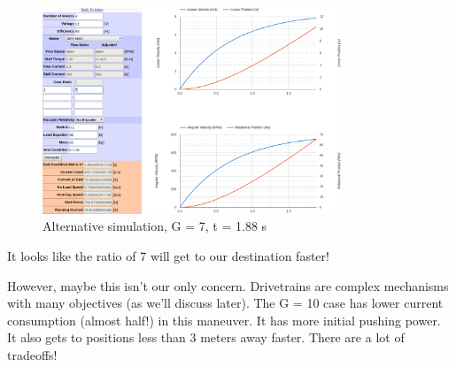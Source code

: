 \documentclass[10pt,letterpaper]{book}
\begin{document}
	\begin{figure}[H] \centering
	\includegraphics[width=0.8\textwidth]{imgs/thsae_2.png}
	\caption{Alternative simulation, G = 7, t = 1.88 s}
	\end{figure}
	
	It looks like the ratio of 7 will get to our destination faster!
	
	However, maybe this isn't our only concern. Drivetrains are complex mechanisms with many objectives (as we'll discuss later). The G = 10 case has lower current consumption (almost half!) in this maneuver. It has more initial pushing power. It also gets to positions less than 3 meters away faster. There are a lot of tradeoffs!
\end{document}
